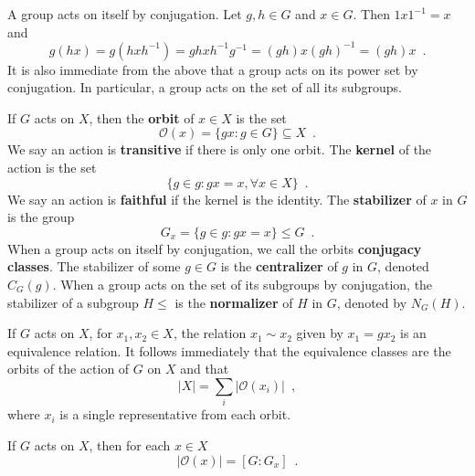 \begin{example} \cite[122]{DummitFoote2004} A group acts on itself by conjugation. Let $g, h \in G$ and $x \in G$. Then $1 x 1^{-1} = x$ and
$$
g(hx) = g(h x h^{-1}) = gh x h^{-1}g^{-1} = (gh) x (gh)^{-1} = (gh)x \enspace.
$$
It is also immediate from the above that a group acts on its power set by conjugation. In particular, a group acts on the set of all its subgroups.
\end{example}

\begin{definition} \cite[100]{Rotman1967} \cite[112]{DummitFoote2004} If $G$ acts on $X$, then the \textbf{orbit} of $x \in X$ is the set
$$\mathcal{O}(x) = \{ gx : g \in G \} \subseteq X \enspace.
$$
We say an action is \textbf{transitive} if there is only one orbit. The \textbf{kernel} of the action is the set
$$
\{ g \in g : gx = x, \forall x \in X \} \enspace.
$$
We say an action is \textbf{faithful} if the kernel is the identity. The \textbf{stabilizer} of $x$ in $G$ is the group
$$
G_x = \{ g \in g : gx = x \} \leq G \enspace.
$$
When a group acts on itself by conjugation, we call the orbits \textbf{conjugacy classes}. The stabilizer of some $g \in G$ is the \textbf{centralizer} of $g$ in $G$, denoted $C_G(g)$. When a group acts on the set of its subgroups by conjugation, the stabilizer of a subgroup $H \leq$ is the \textbf{normalizer} of $H$ in $G$, denoted by $N_G(H)$.
\end{definition}

\begin{proposition} \cite[102]{Rotman1967} \cite[114]{DummitFoote2004} \cite[250]{Tucker1974} If $G$ acts on $X$, for $x_1, x_2 \in X$, the relation $x_1 \sim x_2$ given by $x_1 = gx_2$ is an equivalence relation. It follows immediately that the equivalence classes are the orbits of the action of $G$ on $X$ and that
$$
|X| = \sum_i |\mathcal{O}(x_i)| \enspace,
$$
where $x_i$ is a single representative from each orbit.
\end{proposition}

\begin{theorem} \cite[102]{Rotman1967} If $G$ acts on $X$, then for each $x \in X$
$$
|\mathcal{O}(x)| = [G : G_x] \enspace.
$$
\end{theorem}

